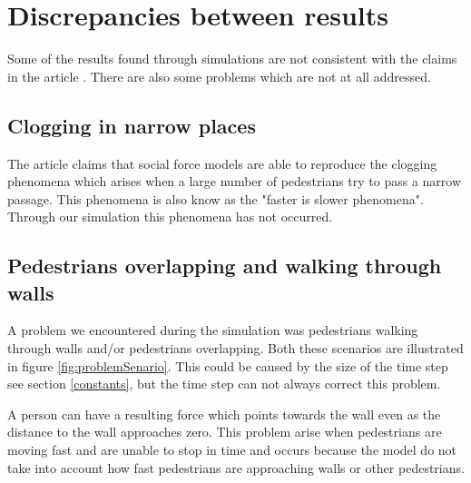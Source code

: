 \section{Discrepancies between results}
\label{sec:discrepancies}
Some of the results found through simulations are not consistent with the 
claims in the article \cite{self-org}. There are also some problems which are 
not at all addressed.

\subsection{Clogging in narrow places}
The article \cite{self-org} claims that social force models are able to reproduce the clogging phenomena which arises when a large number of pedestrians try to pass a narrow passage. This phenomena is also know as the "faster is slower phenomena". Through our simulation this phenomena has not occurred.



\subsection{Pedestrians overlapping and walking through walls}
A problem we encountered during the simulation was pedestrians walking through walls and/or pedestrians overlapping. Both these scenarios are illustrated in figure \ref{fig:problemSenario}. This could be caused by the size of the time step see section \ref{constants}, but the time step can not always correct this problem.

A person can have a resulting force which points towards the wall even as the distance to the wall approaches zero. This problem arise when pedestrians are moving fast and are unable to stop in time and occurs because the model do not take into account how fast pedestrians are approaching walls or other pedestrians.

